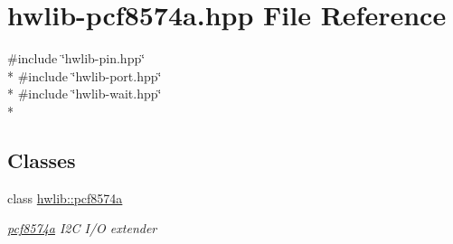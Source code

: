 \hypertarget{hwlib-pcf8574a_8hpp}{}\section{hwlib-\/pcf8574a.hpp File Reference}
\label{hwlib-pcf8574a_8hpp}
{\ttfamily \#include \char`\"{}hwlib-\/pin.\+hpp\char`\"{}}\\*
{\ttfamily \#include \char`\"{}hwlib-\/port.\+hpp\char`\"{}}\\*
{\ttfamily \#include \char`\"{}hwlib-\/wait.\+hpp\char`\"{}}\\*
\subsection*{Classes}
\begin{DoxyCompactItemize}
\item 
class \hyperlink{classhwlib_1_1pcf8574a}{hwlib\+::pcf8574a}
\begin{DoxyCompactList}\small\item\em \hyperlink{classhwlib_1_1pcf8574a}{pcf8574a} I2C I/O extender \end{DoxyCompactList}\end{DoxyCompactItemize}
